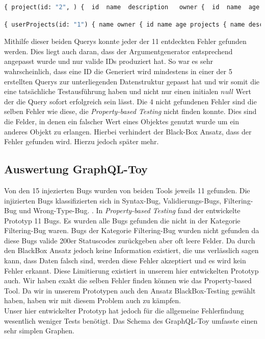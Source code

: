 \begin{lstlisting}[language=GraphQL]
    { project(id: "2", ) {  id  name  description   owner {  id  name  age   }  }  }
\end{lstlisting}

\begin{lstlisting}[language=GraphQL]
    { userProjects(id: "1") { name owner { id name age projects { name description id } } } }
\end{lstlisting}

Mithilfe dieser beiden Querys konnte jeder der 11 entdeckten Fehler gefunden werden.
Dies liegt auch daran, dass der Argumentgenerator entsprechend angepasst wurde und nur valide IDs produziert hat.
So war es sehr wahrscheinlich, dass eine ID die Generiert wird mindestens in einer der 5 erstellten Querys zur unterliegenden Datenstruktur gepasst hat
und wir somit die eine tatsächliche Testausführung haben und nicht nur einen initialen $null$ Wert der die Query sofort erfolgreich sein lässt.
Die 4 nicht gefundenen Fehler sind die selben Fehler wie diese, die \textit{Property-based Testing} \cite[vgl. RQ.2]{property-based-testing} nicht finden konnte.
Dies sind die Felder, in denen ein falscher Wert eines Objektes genutzt wurde um ein anderes Objekt zu erlangen.
Hierbei verhindert der Black-Box Ansatz, dass der Fehler gefunden wird.
Hierzu jedoch später mehr.

\subsection{Auswertung GraphQL-Toy}

Von den 15 injezierten Bugs wurden von beiden Tools jeweils 11 gefunden.
Die injizierten Bugs klassifizierten sich in Syntax-Bug, Validierungs-Bugs, Filtering-Bug und Wrong-Type-Bug. \cite[vgl. RQ 2 Type Errors]{property-based-testing}.
In \textit{Property-based Testing} fand der entwickelte Prototyp 11 Bugs.
Es wurden alle Bugs gefunden die nicht in der Kategorie Filtering-Bug waren.
Bugs der Kategorie Filtering-Bug wurden nicht gefunden da diese Bugs valide 200er Statuscodes zurückgeben aber oft
leere Felder.
Da durch den BlackBox Ansatz jedoch keine Information existiert, die uns verlässlich sagen kann, dass Daten falsch sind,
werden diese Fehler akzeptiert und es wird kein Fehler erkannt.
Diese Limitierung existiert in unserem hier entwickelten Prototyp auch.
Wir haben exakt die selben Fehler finden können wie das Property-based Tool.
Da wir in unserem Prototypen auch den Ansatz BlackBox-Testing gewählt haben, haben wir mit diesem Problem auch zu kämpfen.
\\
Unser hier entwickelter Prototyp hat jedoch für die allgemeine Fehlerfindung wesentlich weniger Tests benötigt.
Das Schema des GraphQL-Toy umfasste einen sehr simplen Graphen.

